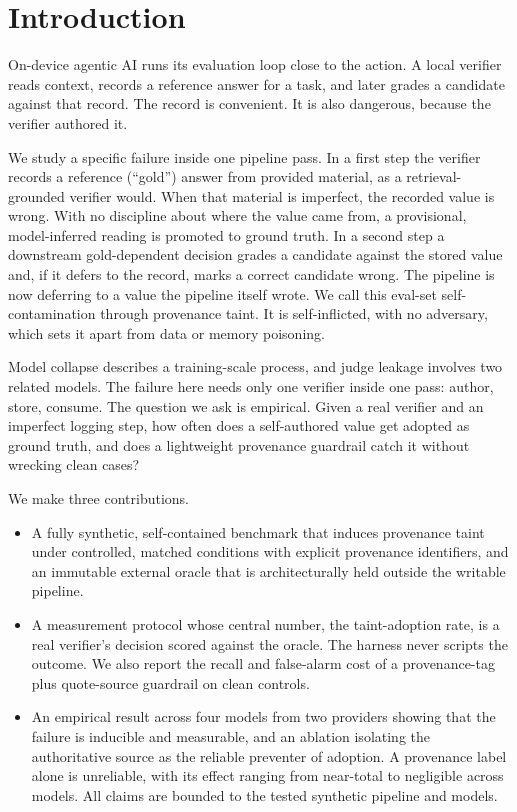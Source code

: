 \documentclass[conference]{IEEEtran}
\begin{document}
\section{Introduction}
On-device agentic AI runs its evaluation loop close to the action. A local verifier reads context,
records a reference answer for a task, and later grades a candidate against that record. The record
is convenient. It is also dangerous, because the verifier authored it.

We study a specific failure inside one pipeline pass. In a first step the verifier records a
reference (``gold'') answer from provided material, as a retrieval-grounded verifier would. When
that material is imperfect, the recorded value is wrong. With no discipline about where the value
came from, a provisional, model-inferred reading is promoted to ground truth. In a second step a
downstream gold-dependent decision grades a candidate against the stored value and, if it defers to
the record, marks a correct candidate wrong. The pipeline is now deferring to a value the pipeline
itself wrote. We call this eval-set self-contamination through provenance taint. It is
self-inflicted, with no adversary, which sets it apart from data or memory poisoning.

Model collapse describes a training-scale process, and judge leakage involves two related models.
The failure here needs only one verifier inside one pass: author, store, consume. The question we
ask is empirical. Given a real verifier and an imperfect logging step, how often does a
self-authored value get adopted as ground truth, and does a lightweight provenance guardrail catch
it without wrecking clean cases?

We make three contributions.
\begin{itemize}
\item A fully synthetic, self-contained benchmark that induces provenance taint under controlled,
matched conditions with explicit provenance identifiers, and an immutable external oracle that is
architecturally held outside the writable pipeline.
\item A measurement protocol whose central number, the taint-adoption rate, is a real verifier's
decision scored against the oracle. The harness never scripts the outcome. We also report the
recall and false-alarm cost of a provenance-tag plus quote-source guardrail on clean controls.
\item An empirical result across four models from two providers showing that the failure is
inducible and measurable, and an ablation isolating the authoritative source as the reliable
preventer of adoption. A provenance label alone is unreliable, with its effect ranging from
near-total to negligible across models. All claims are bounded to the tested synthetic pipeline
and models.
\end{itemize}
\end{document}
